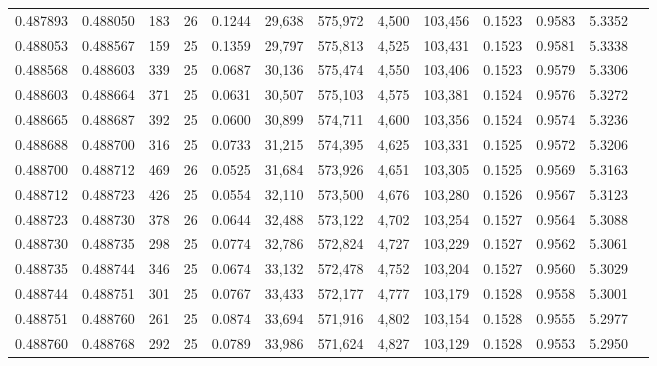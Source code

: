 \begin{tabular}{rrrrrrrrrrrrr}
0.487893 & 0.488050 & 183 &  26 &                                     0.1244 &  29,638 & 575,972 &   4,500 & 103,456 & 0.1523 & 0.9583 & 5.3352 \\
0.488053 & 0.488567 & 159 &  25 &                                     0.1359 &  29,797 & 575,813 &   4,525 & 103,431 & 0.1523 & 0.9581 & 5.3338 \\
0.488568 & 0.488603 & 339 &  25 &                                     0.0687 &  30,136 & 575,474 &   4,550 & 103,406 & 0.1523 & 0.9579 & 5.3306 \\
0.488603 & 0.488664 & 371 &  25 &                                     0.0631 &  30,507 & 575,103 &   4,575 & 103,381 & 0.1524 & 0.9576 & 5.3272 \\
0.488665 & 0.488687 & 392 &  25 &                                     0.0600 &  30,899 & 574,711 &   4,600 & 103,356 & 0.1524 & 0.9574 & 5.3236 \\
0.488688 & 0.488700 & 316 &  25 &                                     0.0733 &  31,215 & 574,395 &   4,625 & 103,331 & 0.1525 & 0.9572 & 5.3206 \\
0.488700 & 0.488712 & 469 &  26 &                                     0.0525 &  31,684 & 573,926 &   4,651 & 103,305 & 0.1525 & 0.9569 & 5.3163 \\
0.488712 & 0.488723 & 426 &  25 &                                     0.0554 &  32,110 & 573,500 &   4,676 & 103,280 & 0.1526 & 0.9567 & 5.3123 \\
0.488723 & 0.488730 & 378 &  26 &                                     0.0644 &  32,488 & 573,122 &   4,702 & 103,254 & 0.1527 & 0.9564 & 5.3088 \\
0.488730 & 0.488735 & 298 &  25 &                                     0.0774 &  32,786 & 572,824 &   4,727 & 103,229 & 0.1527 & 0.9562 & 5.3061 \\
0.488735 & 0.488744 & 346 &  25 &                                     0.0674 &  33,132 & 572,478 &   4,752 & 103,204 & 0.1527 & 0.9560 & 5.3029 \\
0.488744 & 0.488751 & 301 &  25 &                                     0.0767 &  33,433 & 572,177 &   4,777 & 103,179 & 0.1528 & 0.9558 & 5.3001 \\
0.488751 & 0.488760 & 261 &  25 &                                     0.0874 &  33,694 & 571,916 &   4,802 & 103,154 & 0.1528 & 0.9555 & 5.2977 \\
0.488760 & 0.488768 & 292 &  25 &                                     0.0789 &  33,986 & 571,624 &   4,827 & 103,129 & 0.1528 & 0.9553 & 5.2950 \\

\end{tabular}
